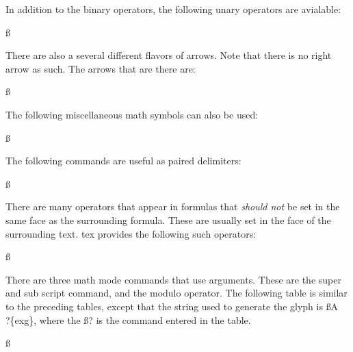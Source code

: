 In addition to the binary operators, the following unary
operators are avialable:{\ss{}

	
		
}

There are also a several different flavors of arrows. Note that
there is no right arrow as such. The arrows that are there
are:{\ss{}

		
	
	
	}

The following miscellaneous math symbols can also be used:{\ss{}

		
	
	
		
		
	}

The following commands are useful as paired delimiters:{\ss{}

		
		
		
		}

There are many operators that appear in formulas that {\it should
not} be set in the same face as the surrounding formula. These
are usually set in the face of the surrounding text. tex provides
the following such operators:{\ss{}

		
		
			
		
		
		
		}

There are three math mode commands that use arguments. These are
the super and sub script command, and the modulo operator. The
following table is similar to the preceding tables, except that
the string used to generate the glyph is {\ss A\\?\{exg\},} where
the {\ss ?} is the command entered in the table. {\ss{}

		}

